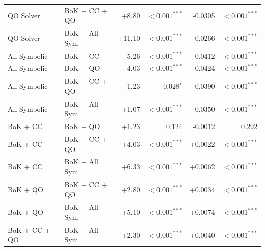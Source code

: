 \begin{table}[!tbh]
{\begin{tabular}{llrrrr}
QO Solver & BoK + CC + QO & +8.80 & $<\!0.001^{***}$ & -0.0305 & $<\!0.001^{***}$ \\
QO Solver & BoK + All Sym & +11.10 & $<\!0.001^{***}$ & -0.0266 & $<\!0.001^{***}$ \\
All Symbolic & BoK + CC & -5.26 & $<\!0.001^{***}$ & -0.0412 & $<\!0.001^{***}$ \\
All Symbolic & BoK + QO & -4.03 & $<\!0.001^{***}$ & -0.0424 & $<\!0.001^{***}$ \\
All Symbolic & BoK + CC + QO & -1.23 & 0.028$^{*}$ & -0.0390 & $<\!0.001^{***}$ \\
All Symbolic & BoK + All Sym & +1.07 & $<\!0.001^{***}$ & -0.0350 & $<\!0.001^{***}$ \\
BoK + CC & BoK + QO & +1.23 & 0.124 & -0.0012 & 0.292 \\
BoK + CC & BoK + CC + QO & +4.03 & $<\!0.001^{***}$ & +0.0022 & $<\!0.001^{***}$ \\
BoK + CC & BoK + All Sym & +6.33 & $<\!0.001^{***}$ & +0.0062 & $<\!0.001^{***}$ \\
BoK + QO & BoK + CC + QO & +2.80 & $<\!0.001^{***}$ & +0.0034 & $<\!0.001^{***}$ \\
BoK + QO & BoK + All Sym & +5.10 & $<\!0.001^{***}$ & +0.0074 & $<\!0.001^{***}$ \\
BoK + CC + QO & BoK + All Sym & +2.30 & $<\!0.001^{***}$ & +0.0040 & $<\!0.001^{***}$ \\
\bottomrule
\end{tabular}%
}
\end{table}
